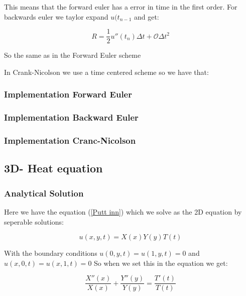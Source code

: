 \documentclass[a4paper,10pt]{article}
\begin{document}
This means that the forward euler has a error in time in the first order. 
For backwards euler we taylor expand $u(t_{n-1}$ and get:

\begin{equation}
  R = \frac{1}{2}u''(t_n)\Delta t + \mathcal{O}\Delta t^2
\end{equation}

So the same as in the Forward Euler scheme

In Crank-Nicolson we use a time centered scheme so we have that:
\begin{equation}
 
\end{equation}





\subsubsection{Implementation Forward Euler}

\subsubsection{Implementation Backward Euler}

\subsubsection{Implementation Cranc-Nicolson}


\subsection{3D- Heat equation}
\subsubsection{Analytical Solution}
Here we have the equation (\ref{Putt inn}) which we solve as the 2D equation by seperable solutions:

\begin{equation}
 u(x,y,t) = X(x)Y(y)T(t)
\end{equation}

With the boundary conditions $u(0,y,t) = u(1,y,t) = 0$ and $u(x,0,t) = u(x,1,t) = 0$
So when we set this in the equation we get:

\begin{equation}
 \frac{X''(x)}{X(x)} + \frac{Y''(y)}{Y(y)} = \frac{T'(t)}{T(t)} 
\end{equation}
\end{document}
